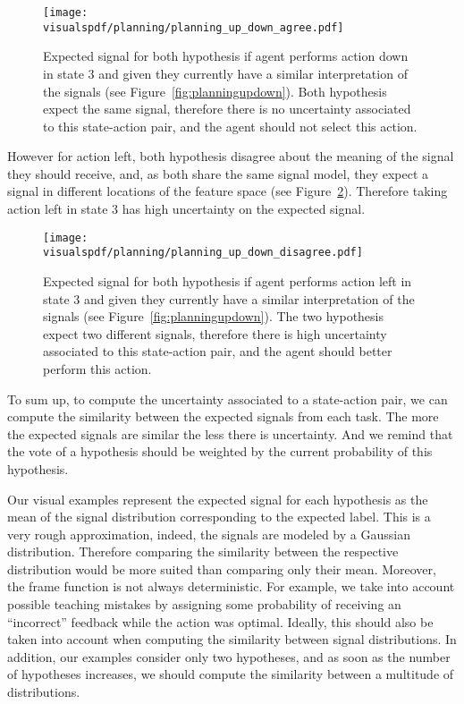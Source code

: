 \begin{figure}[!htbp]
  \centering
  \texttt{[image: \\visualspdf/planning/planning\_up\_down\_agree.pdf]}
  \caption{Expected signal for both hypothesis if agent performs action down in state 3 and given they currently have a similar interpretation of the signals (see Figure~\ref{fig:planningupdown}). Both hypothesis expect the same signal, therefore there is no uncertainty associated to this state-action pair, and the agent should not select this action.}
  \label{fig:uncertaintysignalupdownagree}
\end{figure}

However for action left, both hypothesis disagree about the meaning of the signal they should receive, and, as both share the same signal model, they expect a signal in different locations of the feature space (see Figure~\ref{fig:uncertaintysignalupdowndisagree}). Therefore taking action left in state 3 has high uncertainty on the expected signal.

\begin{figure}[!htbp]
  \centering
  \texttt{[image: \\visualspdf/planning/planning\_up\_down\_disagree.pdf]}
  \caption{Expected signal for both hypothesis if agent performs action left in state 3 and given they currently have a similar interpretation of the signals (see Figure~\ref{fig:planningupdown}). The two hypothesis expect two different signals, therefore there is high uncertainty associated to this state-action pair, and the agent should better perform this action.}
  \label{fig:uncertaintysignalupdowndisagree}
\end{figure}

To sum up, to compute the uncertainty associated to a state-action pair, we can compute the similarity between the expected signals from each task. The more the expected signals are similar the less there is uncertainty. And we remind that the vote of a hypothesis should be weighted by the current probability of this hypothesis.


Our visual examples represent the expected signal for each hypothesis as the mean of the signal distribution corresponding to the expected label. This is a very rough approximation, indeed, the signals are modeled by a Gaussian distribution. Therefore comparing the similarity between the respective distribution would be more suited than comparing only their mean. Moreover, the frame function is not always deterministic. For example, we take into account possible teaching mistakes by assigning some probability of receiving an ``incorrect'' feedback while the action was optimal. Ideally, this should also be taken into account when computing the similarity between signal distributions. In addition, our examples consider only two hypotheses, and as soon as the number of hypotheses increases, we should compute the similarity between a multitude of distributions. 

